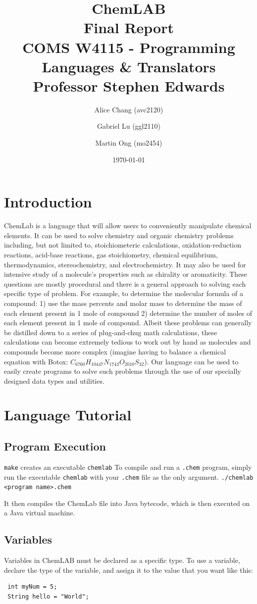 \documentclass[11pt]{report}
\title{ChemLAB \\
Final Report \\
COMS W4115 - Programming Languages \& Translators \\
Professor Stephen Edwards}
\author{Alice Chang (avc2120) \and Gabriel Lu (ggl2110) \and Martin Ong (mo2454)}
\date{\today}             %
\begin{document}
\maketitle
\tableofcontents

\chapter*{Introduction}
ChemLab is a language that will allow users to conveniently manipulate chemical elements. It can be used to solve chemistry and organic chemistry problems including, but not limited to, stoichiometeric calculations, oxidation-reduction reactions, acid-base reactions, gas stoichiometry, chemical equilibrium, thermodynamics, stereochemistry, and electrochemistry. It may also be used for intensive study of a molecule's properties such as chirality or aromaticity. These questions are mostly procedural and there is a general approach to solving each specific type of problem. For example, to determine the molecular formula of a compound: 1) use the mass percents and molar mass to determine the mass of each element present in 1 mole of compound 2) determine the number of moles of each element present in 1 mole of compound. Albeit these problems can generally be distilled down to a series of plug-and-chug math calculations, these calculations can become extremely tedious to work out by hand as molecules and compounds become more complex (imagine having to balance a chemical equation with Botox: $C_{6760}H_{10447}N_{1743}O_{2010}S_{32}$). Our language can be used to easily create programs to solve such problems through the use of our specially designed data types and utilities.

\chapter{Language Tutorial}
\section{Program Execution}
\texttt{make} creates an executable \texttt{chemlab}
To compile and run a \texttt{.chem} program, simply run the executable \texttt{chemlab} with your \texttt{.chem} file as the only argument.
\texttt{./chemlab <program name>.chem}

It then compiles the ChemLab file into Java bytecode, which is then executed on a Java virtual machine.

\section{Variables}
Variables in ChemLAB must be declared as a specific type. To use a variable, declare the type of the variable, and assign it to the value that you want like this:
 \begin{verbatim}
 int myNum = 5;
 String hello = "World"; 
 \end{verbatim}
\end{document}
